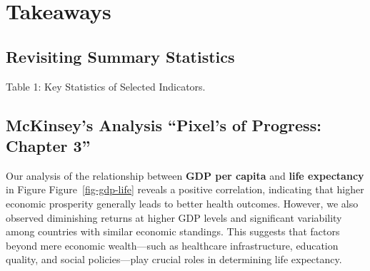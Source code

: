 \documentclass[
]{article}
\begin{document}
\section{Takeaways}\label{takeaways}

\subsection{Revisiting Summary
Statistics}\label{revisiting-summary-statistics}

\begin{table}

\caption{\label{tbl-key-stats}Table 1: Key Statistics of Selected
Indicators.}


\end{table}%

\subsection{McKinsey's Analysis ``Pixel's of Progress: Chapter
3''}\label{mckinseys-analysis-pixels-of-progress-chapter-3}

Our analysis of the relationship between \textbf{GDP per capita} and
\textbf{life expectancy} in Figure Figure~\ref{fig-gdp-life} reveals a
positive correlation, indicating that higher economic prosperity
generally leads to better health outcomes. However, we also observed
diminishing returns at higher GDP levels and significant variability
among countries with similar economic standings. This suggests that
factors beyond mere economic wealth---such as healthcare infrastructure,
education quality, and social policies---play crucial roles in
determining life expectancy.
\end{document}
